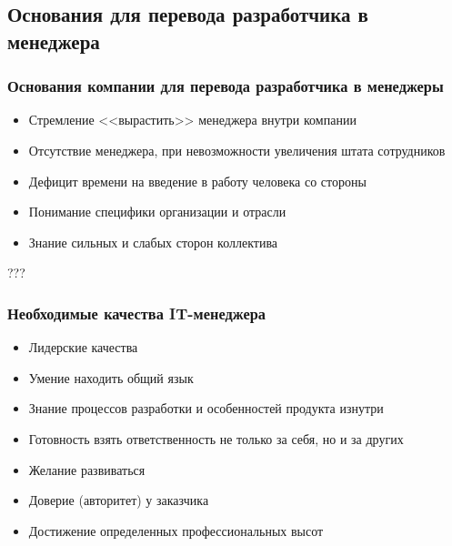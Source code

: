 \documentclass{../industrial-development}
\begin{document}
\subsection{Основания для перевода разработчика в менеджера}
\begin{frame} \frametitle{Основания компании для перевода разработчика в менеджеры}
\begin{itemize}
		\item Стремление <<вырастить>> менеджера внутри компании		
		\item Отсутствие менеджера, при невозможности увеличения штата сотрудников
		\item Дефицит времени на введение в работу человека со стороны	
		\item Понимание специфики организации и отрасли
		\item Знание сильных и слабых сторон коллектива
	\end{itemize}
\end{frame}
\lecturenotes
???

\begin{frame} \frametitle{Необходимые качества IT-менеджера}
\begin{itemize}
		\item Лидерские качества
		\item Умение находить общий язык
		\item Знание процессов разработки и особенностей продукта изнутри
		\item Готовность взять ответственность не только за себя, но и за других
		\item Желание развиваться
		\item Доверие (авторитет) у заказчика
		\item Достижение определенных профессиональных высот

	\end{itemize}
\end{frame}
\lecturenotes
\end{document}
